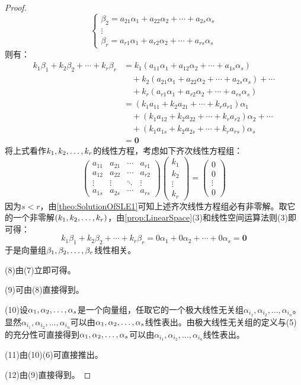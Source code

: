 \begin{proof}
\begin{equation*}
\begin{cases}
			\beta_2=a_{21}\alpha_1+a_{22}\alpha_2+\cdots+a_{2s}\alpha_s \\
			\vdots \\
			\beta_r=a_{r1}\alpha_1+a_{r2}\alpha_2+\cdots+a_{rs}\alpha_s
		\end{cases}
	\end{equation*}
	则有：
	\begin{align*}
		k_1\beta_1+k_2\beta_2+\cdots+k_r\beta_r
		&=k_1(a_{11}\alpha_1+a_{12}\alpha_2+\cdots+a_{1s}\alpha_s) \\
		&\quad+k_2(a_{21}\alpha_1+a_{22}\alpha_2+\cdots+a_{2s}\alpha_s)+\cdots \\
		&\quad+k_r(a_{r1}\alpha_1+a_{r2}\alpha_2+\cdots+a_{rs}\alpha_s) \\
		&=(k_1a_{11}+k_2a_{21}+\cdots+k_ra_{r1})\alpha_1 \\
		&\quad+(k_1a_{12}+k_2a_{22}+\cdots+k_ra_{r2})\alpha_2+\cdots \\
		&\quad+(k_1a_{1s}+k_2a_{2s}+\cdots+k_ra_{rs})\alpha_s \\
		&=\mathbf{0}
	\end{align*}
	将上式看作$k_1, k_2, \dots, k_{r}$的线性方程，考虑如下齐次线性方程组：
	\begin{equation*}
		\begin{pmatrix}
			a_{11} & a_{21} & \cdots & a_{r1} \\
			a_{12} & a_{22} & \cdots & a_{r2} \\
			\vdots & \vdots & \ddots & \vdots \\
			a_{1s} & a_{2s } & \cdots & a_{rs}
		\end{pmatrix}
		\begin{pmatrix}
			k_1 \\
			k_2 \\
			\vdots \\
			k_r
		\end{pmatrix}
		=
		\begin{pmatrix}
			0 \\
			0 \\
			\vdots \\
			0
		\end{pmatrix}
	\end{equation*}
	因为$s<r$，由\cref{theo:SolutionOfSLE1}可知上述齐次线性方程组必有非零解。取它的一个非零解$(k_1, k_2, \dots, k_{r})$，由\cref{prop:LinearSpace}(3)和线性空间运算法则(3)即可得：
	\begin{equation*}
		k_1\beta_1+k_2\beta_2+\cdots+k_r\beta_r=0\alpha_1+0\alpha_2+\cdots+0\alpha_s=\mathbf{0}
	\end{equation*}
	于是向量组$\beta_1, \beta_2, \dots, \beta_{r}$线性相关。\par
	(8)由(7)立即可得。\par
	(9)可由(8)直接得到。\par
	(10)设$\alpha_1, \alpha_2, \dots, \alpha_{s}$是一个向量组，任取它的一个极大线性无关组$\alpha_{i_1},\alpha_{i_2},\dots,\alpha_{i_n}$。显然$\alpha_{i_1},\alpha_{i_2},\dots,\alpha_{i_n}$可以由$\alpha_1, \alpha_2, \dots, \alpha_{s}$线性表出。由极大线性无关组的定义与(5)的充分性可直接得到$\alpha_1, \alpha_2, \dots, \alpha_{s}$可以由$\alpha_{i_1},\alpha_{i_2},\dots,\alpha_{i_n}$线性表出。\par
	(11)由(10)(6)可直接推出。\par
	(12)由(9)直接得到。
\end{proof}

